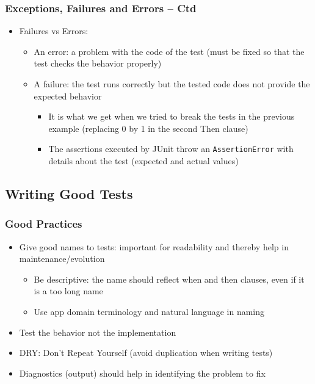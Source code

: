 \documentclass{beamer}
\begin{document}
\begin{frame}[fragile]
  \frametitle{Exceptions, Failures and Errors -- Ctd}
  \begin{itemize}
  \item Failures vs Errors:
    \begin{itemize}
    \item An error: a problem with the code of the test (must be
      fixed so that the test checks the behavior properly)
    \item A failure: the test runs correctly but the tested code does not
      provide the expected behavior
      \begin{itemize}
      \item It is what we get when we tried to break the tests in the
        previous example (replacing 0 by 1 in the second Then clause)
      \item The assertions executed by JUnit throw an
        \texttt{AssertionError} with details about the test (expected
        and actual values)
      \end{itemize}
    \end{itemize}
  \end{itemize}
\end{frame}

\subsection{Writing Good Tests}
\begin{frame}
\frametitle{Good Practices}
\begin{itemize}
\item Give good names to tests: important for readability and thereby
  help in maintenance/evolution
  \begin{itemize}
  \item Be descriptive: the name should reflect when and then clauses,
    even if it is a too long name
  \item Use app domain terminology and natural language in naming
  \end{itemize}
\item Test the behavior not the implementation
\item DRY: Don't Repeat Yourself (avoid duplication when writing tests)
\item Diagnostics (output) should help in identifying the problem to fix
\end{itemize}
\end{frame}
\end{document}
